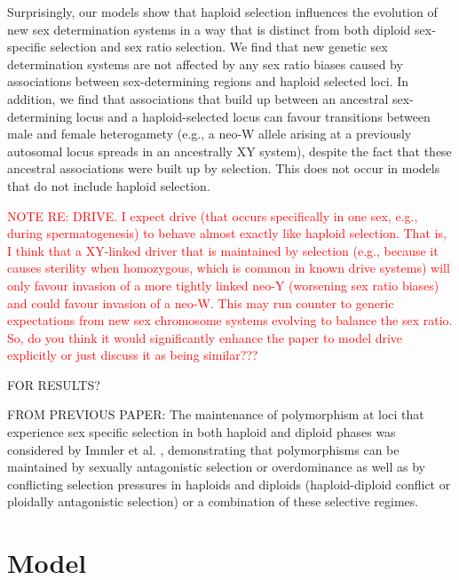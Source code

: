 \documentclass[12pt]{article}
\begin{document}
Surprisingly, our models show that haploid selection influences the evolution of new sex determination systems in a way that is distinct from both diploid sex-specific selection and sex ratio selection. 
We find that new genetic sex determination systems are not affected by any sex ratio biases caused by associations between sex-determining regions and haploid selected loci. 
In addition, we find that associations that build up between an ancestral sex-determining locus and a haploid-selected locus can favour transitions between male and female heterogamety (e.g., a neo-W allele arising at a previously autosomal locus spreads in an ancestrally XY system), despite the fact that these ancestral associations were built up by selection. 
This does not occur in models that do not include haploid selection. 

\textcolor{red}{NOTE RE: DRIVE. I expect drive (that occurs specifically in one sex, e.g., during spermatogenesis) to behave almost exactly like haploid selection. That is, I think that a XY-linked driver that is maintained by selection (e.g., because it causes sterility when homozygous, which is common in known drive systems) will only favour invasion of a more tightly linked neo-Y (worsening sex ratio biases) and could favour invasion of a neo-W. This may run counter to generic expectations from new sex chromosome systems evolving to balance the sex ratio. So, do you think it would significantly enhance the paper to model drive explicitly or just discuss it as being similar???}

{\color{blue} 
FOR RESULTS?

FROM PREVIOUS PAPER:
The maintenance of polymorphism at loci that experience sex specific selection in both haploid and diploid phases was considered by Immler et al. \cite{Immler:2012tl}, demonstrating that polymorphisms can be maintained by sexually antagonistic selection or overdominance as well as by conflicting selection pressures in haploids and diploids (haploid-diploid conflict or ploidally antagonistic selection) or a combination of these selective regimes.  
}


\section*{Model}
\end{document}
